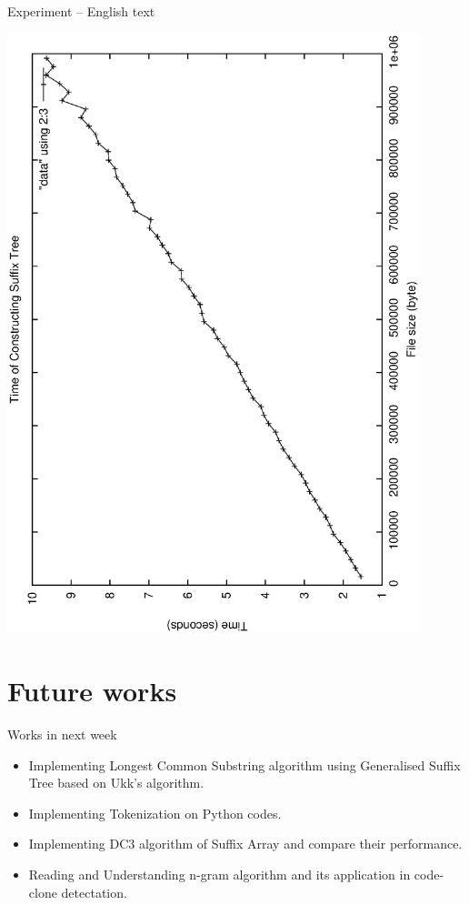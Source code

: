 \begin{frame}{Experiment -- English text}

\includegraphics[angle=270,width=0.9\textwidth]{plot.ps}
\end{frame}
\section{Future works}
\begin{frame}{Works in next week}
\transwipe[direction=270]
\begin{itemize}[<+->]
\item Implementing \alert{Longest Common Substring} algorithm using
\alert{Generalised Suffix Tree} based on Ukk's algorithm.
\item Implementing \alert{Tokenization} on Python codes.
\item Implementing \alert{DC3} algorithm of \alert{Suffix Array} and compare
their performance.
\item Reading and Understanding \alert{n-gram} algorithm and its
application in code-clone detectation.
\end{itemize}
\end{frame}

